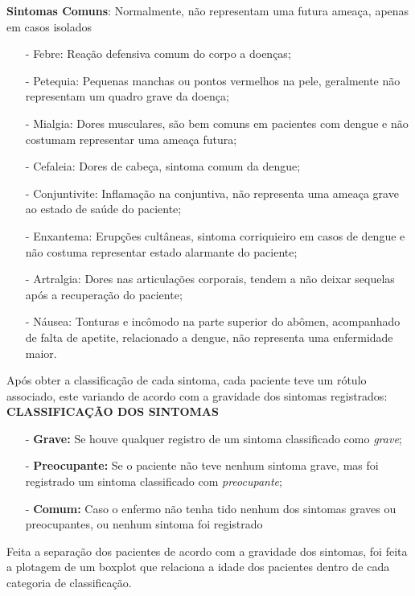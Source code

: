 \documentclass[a4paper, 12pt, twoside]{article}
\begin{document}
\vspace{0.5cm}
\textbf{Sintomas Comuns}: Normalmente, não representam uma futura ameaça, apenas em casos isolados
\begin{itemize}[nosep]
    \item[-] Febre: Reação defensiva comum do corpo a doenças;
    \item[-] Petequia: Pequenas manchas ou pontos vermelhos na pele, geralmente não representam um quadro grave da doença;
    \item[-] Mialgia: Dores musculares, são bem comuns em pacientes com dengue e não costumam representar uma ameaça futura;
    \item[-] Cefaleia: Dores de cabeça, sintoma comum da dengue;
    \item[-] Conjuntivite: Inflamação na conjuntiva, não representa uma ameaça grave ao estado de saúde do paciente;
    \item[-] Enxantema: Erupções cultâneas, sintoma corriquieiro em casos de dengue e não costuma representar estado alarmante do paciente;
    \item[-] Artralgia: Dores nas articulações corporais, tendem a não deixar sequelas após a recuperação do paciente;
    \item[-] Náusea: Tonturas e incômodo na parte superior do abômen, acompanhado de falta de apetite, relacionado a dengue, não representa uma enfermidade maior.
\end{itemize}

Após obter a classificação de cada sintoma, cada paciente teve um rótulo associado, este variando de acordo com a gravidade dos sintomas registrados:
\vspace{0.5cm}
\\
\textbf{CLASSIFICAÇÃO DOS SINTOMAS}
\begin{itemize}[nosep]
    \item[-] \textbf{Grave:} Se houve qualquer registro de um sintoma classificado como \emph{grave};
    \item[-] \textbf{Preocupante:} Se o paciente não teve nenhum sintoma grave, mas foi registrado um sintoma classificado com \emph{preocupante};
    \item[-] \textbf{Comum:} Caso o enfermo não tenha tido nenhum dos sintomas graves ou preocupantes, ou nenhum sintoma foi registrado
\end{itemize}
\vspace{0.5cm}
\hspace{1cm}Feita a separação dos pacientes de acordo com a gravidade dos sintomas, foi feita a plotagem de um boxplot que relaciona a idade dos pacientes dentro de cada categoria de classificação.
\end{document}
